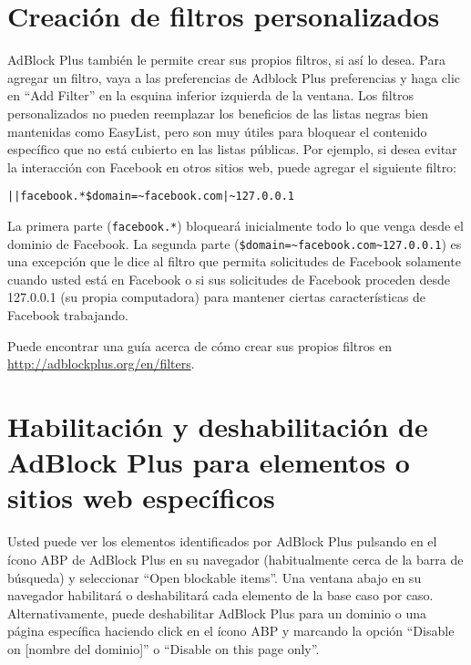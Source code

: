 \documentclass[10pt,a5paper,twoside,,]{book}
\begin{document}
\section{Creación de filtros
personalizados}\label{creaciuxf3n-de-filtros-personalizados}

AdBlock Plus también le permite crear sus propios filtros, si así lo
desea. Para agregar un filtro, vaya a las preferencias de Adblock Plus
preferencias y haga clic en ``Add Filter'' en la esquina inferior
izquierda de la ventana. Los filtros personalizados no pueden reemplazar
los beneficios de las listas negras bien mantenidas como EasyList, pero
son muy útiles para bloquear el contenido específico que no está
cubierto en las listas públicas. Por ejemplo, si desea evitar la
interacción con Facebook en otros sitios web, puede agregar el siguiente
filtro:

\begin{verbatim}
||facebook.*$domain=~facebook.com|~127.0.0.1
\end{verbatim}

La primera parte (\texttt{\textbar{}\textbar{}facebook.*}) bloqueará
inicialmente todo lo que venga desde el dominio de Facebook. La segunda
parte
(\texttt{\$domain=\textasciitilde{}facebook.com\textbar{}\textasciitilde{}127.0.0.1})
es una excepción que le dice al filtro que permita solicitudes de
Facebook solamente cuando usted está en Facebook o si sus solicitudes de
Facebook proceden desde 127.0.0.1 (su propia computadora) para mantener
ciertas características de Facebook trabajando.

Puede encontrar una guía acerca de cómo crear sus propios filtros en
\url{http://adblockplus.org/en/filters}.

\section{Habilitación y deshabilitación de AdBlock Plus para elementos o
sitios web
específicos}\label{habilitaciuxf3n-y-deshabilitaciuxf3n-de-adblock-plus-para-elementos-o-sitios-web-especuxedficos}

Usted puede ver los elementos identificados por AdBlock Plus pulsando en
el ícono ABP de AdBlock Plus en su navegador (habitualmente cerca de la
barra de búsqueda) y seleccionar ``Open blockable items''. Una ventana
abajo en su navegador habilitará o deshabilitará cada elemento de la
base caso por caso. Alternativamente, puede deshabilitar AdBlock Plus
para un dominio o una página específica haciendo click en el ícono ABP y
marcando la opción ``Disable on {[}nombre del dominio{]}'' o ``Disable
on this page only''.
\end{document}
